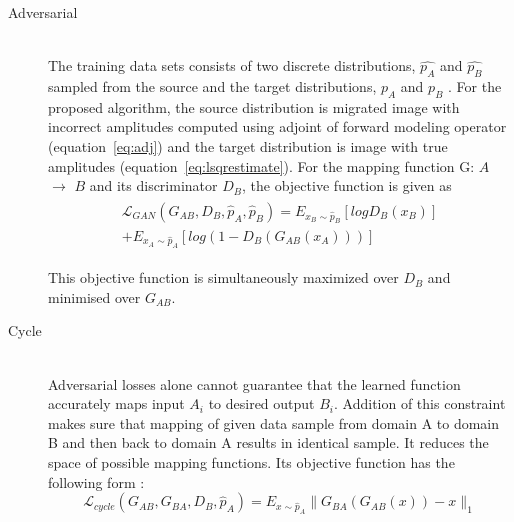 \begin{description}
\item[Adversarial  ] \hfill \\ The training data sets consists of two discrete distributions, $\hat{p_A}$ and $\hat{p_B}$ sampled from the source and the target distributions, $p_{A}$ and $p_{B}$ .  For the proposed algorithm, the source distribution is migrated image with incorrect amplitudes computed using adjoint of forward modeling operator (equation~\ref{eq:adj}) and the target distribution is image with true amplitudes (equation~\ref{eq:lsqrestimate}). For the mapping function G: $A$ $\rightarrow$ $B$ and its discriminator $D_{B}$, the objective function is given as \cite[]{benaim2017one,zhu2017unpaired,goodfellow2014generative} 
\begin{eqnarray}
\begin{split}
\mathcal L_{GAN}(G_{AB},D_{B},\hat{p}_A,\hat{p}_B)=E_{x_B \sim \hat{p}_B}[log {D_B}({x_B})] \\+ E_{x_A \sim \hat{p}_A}[log ({1-D_B}(G_{AB}({x_A})))]
\end{split}
\label{eq:adversarial}
\end{eqnarray}

 This objective function is simultaneously maximized over $D_B$ and minimised over $G_{AB}$. 

\item[Cycle    ] \hfill \\ Adversarial losses alone cannot guarantee that the learned function accurately maps input $A_{i}$ to desired output $B_{i}$. Addition of this constraint makes sure that mapping of given data sample from domain A to domain B and then back to domain A results in identical sample. It reduces the space of possible mapping functions. Its objective function has the following form \cite[]{zhu2017unpaired}:
\begin{equation}
\mathcal L_{cycle}(G_{AB},G_{BA},D_{B},\hat{p}_A)=E_{x \sim \hat{p}_A}\parallel G_{BA}(G_{AB}(x))-x \parallel_1
\label{eq:cycle}
\end{equation} 


\end{description}
